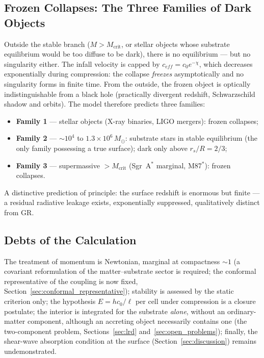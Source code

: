 \documentclass[11pt,a4paper]{article}
\theoremstyle{plain}
\theoremstyle{remark}
\begin{document}
\subsection{Frozen Collapses: The Three Families of Dark Objects}
Outside the stable branch ($M > M_{\text{crit}}$, or stellar objects whose substrate equilibrium would be too diffuse to be dark), there is no equilibrium --- but no singularity either. The infall velocity is capped by $c_{eff} = c_0 e^{-\chi}$, which decreases exponentially during compression: the collapse \emph{freezes} asymptotically and no singularity forms in finite time. From the outside, the frozen object is optically indistinguishable from a black hole (practically divergent redshift, Schwarzschild shadow and orbits). The model therefore predicts three families:
\begin{itemize}
    \item \textbf{Family 1} --- stellar objects (X-ray binaries, LIGO mergers): frozen collapses;
    \item \textbf{Family 2} --- $\sim10^{4}$ to $1.3\times10^{6}\,M_\odot$: substrate stars in stable equilibrium (the only family possessing a true surface); dark only above $r_s/R = 2/3$;
    \item \textbf{Family 3} --- supermassive $> M_{\text{crit}}$ (Sgr~A$^*$ marginal, M87$^*$): frozen collapses.
\end{itemize}
A distinctive prediction of principle: the surface redshift is enormous but finite --- a residual radiative leakage exists, exponentially suppressed, qualitatively distinct from GR.

\subsection{Debts of the Calculation}
The treatment of momentum is Newtonian, marginal at compactness $\sim1$ (a covariant reformulation of the matter--substrate sector is required; the conformal representative of the coupling is now fixed, Section~\ref{sec:conformal_representative}); stability is assessed by the static criterion only; the hypothesis $E = hc_0/\ell$ per cell under compression is a closure postulate; the interior is integrated for the substrate \emph{alone}, without an ordinary-matter component, although an accreting object necessarily contains one (the two-component problem, Sections~\ref{sec:lrd} and~\ref{sec:open_problems}); finally, the shear-wave absorption condition at the surface (Section~\ref{sec:discussion}) remains undemonstrated.
\end{document}
